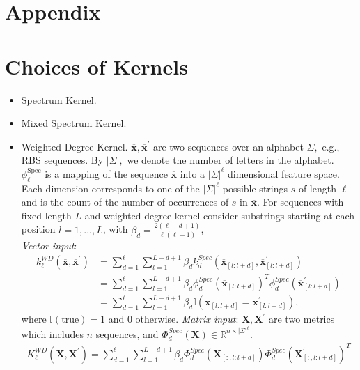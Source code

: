\section*{Appendix}

\section{Choices of Kernels}

\begin{itemize}
    \item Spectrum Kernel.
    \item Mixed Spectrum Kernel.
    \item Weighted Degree Kernel. 
     $\overline{\mathbf{x}}, \overline{\mathbf{x}}^{\prime}$ are two sequences over an alphabet $\Sigma,$ e.g., RBS sequences. By $|\Sigma|,$ we denote the number of letters in the alphabet. $\phi_{\ell}^{\text {Spec}}$ is a mapping of the sequence $\overline{\mathbf{x}}$ into a $|\Sigma|^{\ell}$ dimensional feature space. Each dimension corresponds to one of the $|\Sigma|^{\ell}$ possible strings $s$ of length $\ell$ and is the count of the
    number of occurrences of $s$ in $\overline{\mathbf{x}}$. 
    For sequences with fixed length $L$ and weighted degree kernel consider substrings starting at each position $l = 1, ..., L$, with $\beta_d = \frac{2(\ell - d + 1)}{\ell(\ell+1)}$, \\
    \textit{Vector input}: 
    \begin{align}
        k_\ell^{WD}(\overline{\mathbf{x}}, \overline{\mathbf{x}}^\prime) 
        &= \sum_{d=1}^{\ell} \sum_{l=1}^{L-d+1} \beta_d k_d^{Spec}(\overline{\mathbf{x}}_{[l:l+d]}, \overline{\mathbf{x}}_{[l:l+d]}^\prime)\\
        &= \sum_{d=1}^{\ell} \sum_{l=1}^{L-d+1} \beta_d \phi_d^{Spec}(\overline{\mathbf{x}}_{[l:l+d]})^T \phi_d^{Spec}(\overline{\mathbf{x}}_{[l:l+d]}^\prime)\\
        &= \sum_{d=1}^{\ell} \sum_{l=1}^{L-d+1} \beta_d \mathbb{I}(\overline{\mathbf{x}}_{[l:l+d]} = \overline{\mathbf{x}}_{[l:l+d]}^\prime),
    \end{align}
    where $\mathbb{I}(\text{true}) = 1$ and 0 otherwise. 
    \textit{Matrix input}: $\mathbf{X}, \mathbf{X}^\prime$ are two metrics which includes $n$ sequences, and $\Phi_d^{Spec}(\mathbf{X}) \in \mathbb{R}^{n \times |\Sigma|^{\ell}}$.
    \begin{align}
        K_\ell^{WD}(\mathbf{X}, \mathbf{X}^\prime)
        = \sum_{d=1}^{\ell} \sum_{l=1}^{L-d+1} \beta_d \Phi_d^{Spec}(\mathbf{X}_{[:, l:l+d]}) \Phi_d^{Spec}(\mathbf{X}_{[:, l:l+d]}^\prime)^T
    \end{align}
    

\end{itemize}
